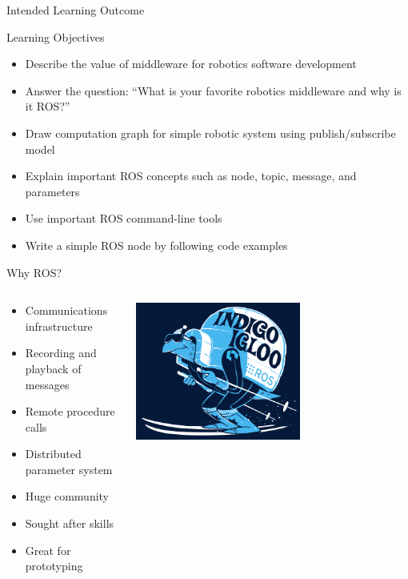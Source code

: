 \documentclass[aspectratio=43]{beamer}
\begin{document}
\begin{frame}{Intended Learning Outcome}
	\begin{block}{Learning Objectives}
		\begin{itemize}
			\item<1> Describe the value of middleware for robotics software development
			\item<0> Answer the question: ``What is your favorite robotics middleware and why is it ROS?''
			\item<0> Draw computation graph for simple robotic system using publish/subscribe model
			\item<0> Explain important ROS concepts such as node, topic, message, and parameters
			\item<0> Use important ROS command-line tools
			\item<0> Write a simple ROS node by following code examples
		\end{itemize}
	\end{block}
\end{frame}


\begin{frame}{Why ROS?}
\begin{columns}
	\begin{column}{0.55\textwidth}
		\begin{itemize}
			\item Communications infrastructure
                          \item Recording and playback of messages
                          \item Remote procedure calls
                          \item Distributed parameter system
                          \item Huge community
                          \item Sought after skills
                          \item Great for prototyping
		\end{itemize} 
        \end{column} 
        \begin{column}{0.45\textwidth} 
          \centering 
          \includegraphics[width=0.6\textwidth]{fig/indigoigloo_600.png} 
        \end{column}
\end{columns}
\end{frame}
\end{document}
